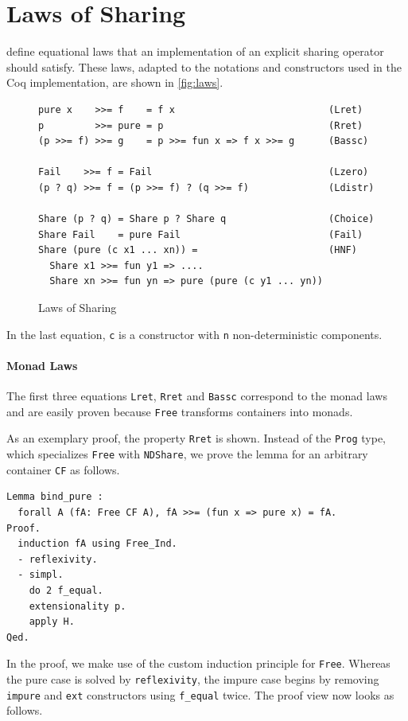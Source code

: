 \documentclass[a4paper, 11pt, fleqn, twoside, abstract=on]{scrreprt}
\newcommand{\cinl}[1]{\texttt{#1}}
\begin{document}
\section{Laws of Sharing}
\citet{fischer2009purely} define equational laws that an implementation of an explicit sharing operator should satisfy.
These laws, adapted to the notations and constructors used in the Coq implementation, are shown in \autoref{fig:laws}.

\begin{figure}[H]
\begin{verbatim}
pure x    >>= f    = f x                           (Lret)
p         >>= pure = p                             (Rret)
(p >>= f) >>= g    = p >>= fun x => f x >>= g      (Bassc)

Fail    >>= f = Fail                               (Lzero)
(p ? q) >>= f = (p >>= f) ? (q >>= f)              (Ldistr)

Share (p ? q) = Share p ? Share q                  (Choice)
Share Fail    = pure Fail                          (Fail)
Share (pure (c x1 ... xn)) =                       (HNF)
  Share x1 >>= fun y1 => ....
  Share xn >>= fun yn => pure (pure (c y1 ... yn))
\end{verbatim}
\caption{Laws of Sharing}
\label{fig:laws}
\end{figure}
\noindent
In the last equation, \cinl{c} is a constructor with \cinl{n} non-deterministic components.

\paragraph{Monad Laws}
The first three equations \cinl{Lret}, \cinl{Rret} and \cinl{Bassc} correspond to the monad laws and are easily proven because \cinl{Free} transforms containers into monads.

As an exemplary proof, the property \cinl{Rret} is shown.
Instead of the \cinl{Prog} type, which specializes \cinl{Free} with \cinl{NDShare}, we prove the lemma for an arbitrary container \cinl{CF} as follows.

\begin{verbatim}
Lemma bind_pure :
  forall A (fA: Free CF A), fA >>= (fun x => pure x) = fA.
Proof.
  induction fA using Free_Ind.
  - reflexivity.
  - simpl.
    do 2 f_equal.
    extensionality p.
    apply H.
Qed.
\end{verbatim}

In the proof, we make use of the custom induction principle for \cinl{Free}.
Whereas the pure case is solved by \cinl{reflexivity}, the impure case begins by removing \cinl{impure} and \cinl{ext} constructors using \cinl{f_equal} twice.
The proof view now looks as follows.
\end{document}
